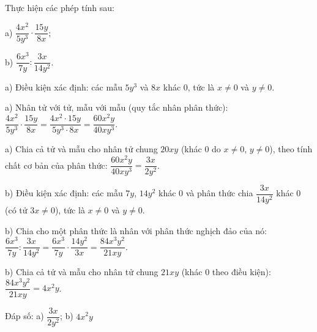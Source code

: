 \begin{problem}[8DS-PS-021]
Thực hiện các phép tính sau:

a) $\dfrac{4x^2}{5y^3} \cdot \dfrac{15y}{8x}$;

b) $\dfrac{6x^3}{7y} : \dfrac{3x}{14y^2}$.

\begin{solution}
a) Điều kiện xác định: các mẫu $5y^3$ và $8x$ khác $0$, tức là $x \neq 0$ và $y \neq 0$.

a) Nhân tử với tử, mẫu với mẫu (quy tắc nhân phân thức): $\dfrac{4x^2}{5y^3} \cdot \dfrac{15y}{8x} = \dfrac{4x^2 \cdot 15y}{5y^3 \cdot 8x} = \dfrac{60x^2y}{40xy^3}$.

a) Chia cả tử và mẫu cho nhân tử chung $20xy$ (khác $0$ do $x \neq 0$, $y \neq 0$), theo tính chất cơ bản của phân thức: $\dfrac{60x^2y}{40xy^3} = \dfrac{3x}{2y^2}$.

b) Điều kiện xác định: các mẫu $7y$, $14y^2$ khác $0$ và phân thức chia $\dfrac{3x}{14y^2}$ khác $0$ (có tử $3x \neq 0$), tức là $x \neq 0$ và $y \neq 0$.

b) Chia cho một phân thức là nhân với phân thức nghịch đảo của nó: $\dfrac{6x^3}{7y} : \dfrac{3x}{14y^2} = \dfrac{6x^3}{7y} \cdot \dfrac{14y^2}{3x} = \dfrac{84x^3y^2}{21xy}$.

b) Chia cả tử và mẫu cho nhân tử chung $21xy$ (khác $0$ theo điều kiện): $\dfrac{84x^3y^2}{21xy} = 4x^2y$.

Đáp số: a) $\boxed{\dfrac{3x}{2y^2}}$; b) $\boxed{4x^2y}$
\end{solution}
\end{problem}

